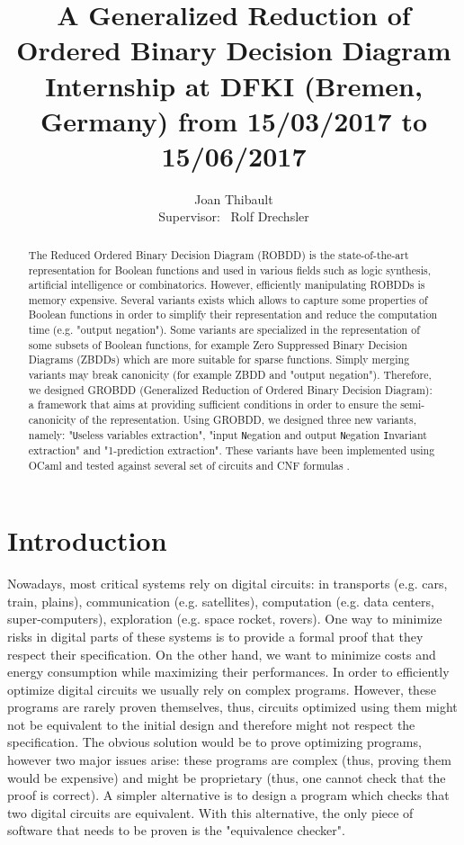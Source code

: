 \documentclass[a4paper,10pt]{article}
\title{A Generalized Reduction of Ordered Binary Decision Diagram\\{\small Internship at DFKI (Bremen, Germany) from 15/03/2017 to 15/06/2017}}
\author{Joan Thibault\\Supervisor: ~Rolf Drechsler}
\newcommand{\Uextract}{"\texttt{U}seless variables extraction"}
\newcommand{\NNIextract}{"input \texttt{N}egation and output \texttt{N}egation \texttt{I}nvariant extraction"}
\newcommand{\Xextract}{"1-prediction extraction"}
\begin{document}
\maketitle
\begin{abstract}
The Reduced Ordered Binary Decision Diagram (ROBDD)\cite{Bryant1986, Somenzi1999} is the state-of-the-art representation for Boolean functions and used in various fields such as logic synthesis, artificial intelligence or combinatorics.
However, efficiently manipulating ROBDDs is memory expensive.
Several variants exists which allows to capture some properties of Boolean functions in order to simplify their representation and reduce the computation time (e.g. "output negation").
Some variants are specialized in the representation of some subsets of Boolean functions, for example Zero Suppressed Binary Decision Diagrams (ZBDDs) which are more suitable for sparse functions.
Simply merging variants may break canonicity (for example ZBDD and "output negation").
Therefore, we designed GROBDD (Generalized Reduction of Ordered Binary Decision Diagram): a framework that aims at providing sufficient conditions in order to ensure the semi-canonicity of the representation.
Using GROBDD, we designed three new variants, namely: \Uextract{}, \NNIextract{} and \Xextract{}.
These variants have been implemented using OCaml \cite{DAGamlGitHub} and tested against several set of circuits \cite{BenchSatlib, BenchLgsynth91} and CNF formulas \cite{BenchIscas99}.
\end{abstract}

\newpage

\section{Introduction}

Nowadays, most critical systems rely on digital circuits: in transports (e.g. cars, train, plains), communication (e.g. satellites), computation (e.g. data centers, super-computers), exploration (e.g. space rocket, rovers).
One way to minimize risks in digital parts of these systems is to provide a formal proof that they respect their specification.
On the other hand, we want to minimize costs and energy consumption while maximizing their performances.
In order to efficiently optimize digital circuits we usually rely on complex programs.
However, these programs are rarely proven themselves, thus, circuits optimized using them might not be equivalent to the initial design and therefore might not respect the specification.
The obvious solution would be to prove optimizing programs, however two major issues arise: these programs are complex (thus, proving them would be expensive) and might be proprietary (thus, one cannot check that the proof is correct).
A simpler alternative is to design a program which checks that two digital circuits are equivalent.
With this alternative, the only piece of software that needs to be proven is the "equivalence checker".
\end{document}

